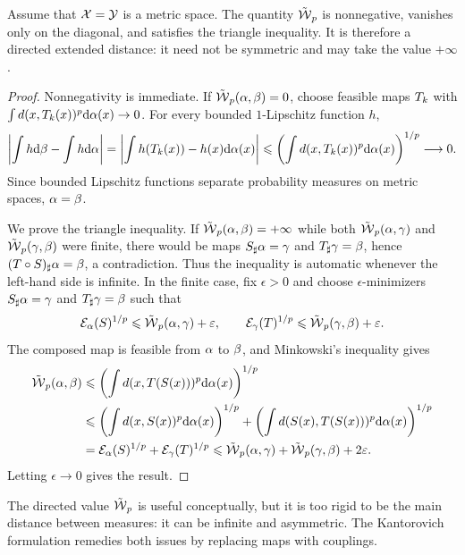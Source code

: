 \begin{prop}\label{prop-directed-monge-distance}
	Assume that $\mathcal{X}=\mathcal{Y}$ is a metric space. The quantity $\tilde{\operatorname{\mathcal{W}}}_p$ is nonnegative, vanishes only on the diagonal, and satisfies the triangle inequality. It is therefore a directed extended distance: it need not be symmetric and may take the value $+\infty$.
\end{prop}
\begin{proof}
	Nonnegativity is immediate. If $\tilde{\operatorname{\mathcal{W}}}_p(\alpha,\beta)=0$, choose feasible maps $T_k$ with $\int d(x,T_k(x))^p\mathrm{d}\alpha(x)\to0$. For every bounded $1$-Lipschitz function $h$,
	\[
		\left|\int h\mathrm{d}\beta-\int h\mathrm{d}\alpha\right|
		=
		\left|\int h(T_k(x))-h(x)\mathrm{d}\alpha(x)\right|
		\leqslant
		\left(\int d(x,T_k(x))^p\mathrm{d}\alpha(x)\right)^{1/p}
		\longrightarrow0.
	\]
	Since bounded Lipschitz functions separate probability measures on metric spaces, $\alpha=\beta$.

	We prove the triangle inequality. If $\tilde{\operatorname{\mathcal{W}}}_p(\alpha,\beta)=+\infty$ while both $\tilde{\operatorname{\mathcal{W}}}_p(\alpha,\gamma)$ and $\tilde{\operatorname{\mathcal{W}}}_p(\gamma,\beta)$ were finite, there would be maps $S_\sharp\alpha=\gamma$ and $T_\sharp\gamma=\beta$, hence $(T\circ S)_\sharp\alpha=\beta$, a contradiction. Thus the inequality is automatic whenever the left-hand side is infinite. In the finite case, fix $\epsilon>0$ and choose $\epsilon$-minimizers $S_\sharp\alpha=\gamma$ and $T_\sharp\gamma=\beta$ such that
	\[
		\mathcal{E}_\alpha(S)^{1/p}\leqslant\tilde{\operatorname{\mathcal{W}}}_p(\alpha,\gamma)+\varepsilon,
		\qquad
		\mathcal{E}_\gamma(T)^{1/p}\leqslant\tilde{\operatorname{\mathcal{W}}}_p(\gamma,\beta)+\varepsilon.
	\]
	The composed map is feasible from $\alpha$ to $\beta$, and Minkowski's inequality gives
	\[
	\begin{aligned}
		\tilde{\operatorname{\mathcal{W}}}_p(\alpha,\beta)
		&\leqslant
		\left(\int d(x,T(S(x)))^p\mathrm{d}\alpha(x)\right)^{1/p} \\
		&\leqslant
		\left(\int d(x,S(x))^p\mathrm{d}\alpha(x)\right)^{1/p}
		+
		\left(\int d(S(x),T(S(x)))^p\mathrm{d}\alpha(x)\right)^{1/p} \\
		&=
		\mathcal{E}_\alpha(S)^{1/p}+\mathcal{E}_\gamma(T)^{1/p}
		\leqslant
		\tilde{\operatorname{\mathcal{W}}}_p(\alpha,\gamma)+\tilde{\operatorname{\mathcal{W}}}_p(\gamma,\beta)+2\varepsilon.
	\end{aligned}
	\]
	Letting $\epsilon\to0$ gives the result.
\end{proof}

The directed value $\tilde{\operatorname{\mathcal{W}}}_p$ is useful conceptually, but it is too rigid to be the main distance between measures: it can be infinite and asymmetric. The Kantorovich formulation remedies both issues by replacing maps with couplings.

